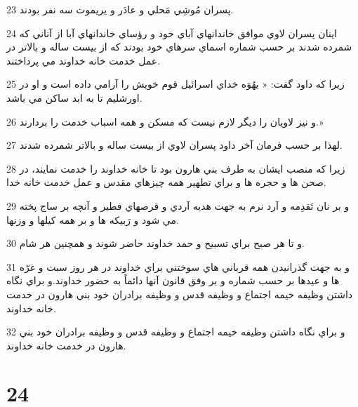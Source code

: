\par 23 پسران مُوشِي مَحلي و عادَر و يريموت سه نفر بودند.
\par 24 اينان پسران لاوي موافق خاندانهاي آباي خود و رؤساي خاندانهاي آبا از آناني که شمرده شدند بر حسب شماره اسماي سرهاي خود بودند که از بيست ساله و بالاتر در عمل خدمت خانه خداوند مي پرداختند.
\par 25 زيرا که داود گفت: « يهُوَه خداي اسرائيل قوم خويش را آرامي داده است و او در اورشليم تا به ابد ساکن مي باشد.
\par 26 و نيز لاويان را ديگر لازم نيست که مسکن و همه اسباب خدمت را بردارند.»
\par 27 لهذا بر حسب فرمان آخر داود پسران لاوي از بيست ساله و بالاتر شمرده شدند.
\par 28 زيرا که منصب ايشان به طرف بني هارون بود تا خانه خداوند را خدمت نمايند، در صحن ها و حجره ها و براي تطهير همه چيزهاي مقدس و عمل خدمت خانه خدا.
\par 29 و بر نان تَقدِمه و آرد نرم به جهت هديه آردي و قرصهاي فطير و آنچه بر ساج پخته مي شود و رَبيکه ها و بر همه کيلها و وزنها.
\par 30 و تا هر صبح براي تسبيح و حمد خداوند حاضر شوند و همچنين هر شام.
\par 31 و به جهت گذرانيدن همه قرباني هاي سوختني براي خداوند در هر روز سبت و غرّه ها و عيدها بر حسب شماره و بر وفق قانون آنها دائماً به حضور خداوند.و براي نگاه داشتن وظيفه خيمه اجتماع و وظيفه قدس و وظيفه برادران خود بني هارون در خدمت خانه خداوند.
\par 32 و براي نگاه داشتن وظيفه خيمه اجتماع و وظيفه قدس و وظيفه برادران خود بني هارون در خدمت خانه خداوند.
 
\chapter{24}

